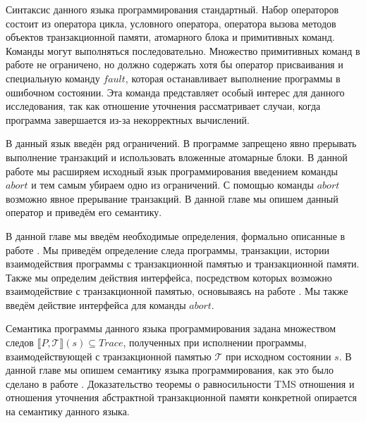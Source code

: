 Синтаксис данного языка программирования стандартный. Набор операторов состоит из оператора цикла, условного оператора, оператора вызова методов объектов транзакционной памяти, атомарного блока и примитивных команд. Команды могут выполняться последовательно. Множество примитивных команд в работе \cite{tms_article} не ограничено, но должно содержать хотя бы оператор присваивания и специальную команду $fault$, которая останавливает выполнение программы в ошибочном состоянии. Эта команда представляет особый интерес для данного исследования, так как отношение уточнения рассматривает случаи, когда программа завершается из-за некорректных вычислений.

В данный язык \cite{tms_article} введён ряд ограничений. В программе запрещено явно прерывать выполнение транзакций и использовать вложенные атомарные блоки. В данной работе мы расширяем исходный язык программирования введением команды $abort$ и тем самым убираем одно из ограничений. С помощью команды $abort$ возможно явное прерывание транзакций. В данной главе мы опишем данный оператор и приведём его семантику.

В данной главе мы введём необходимые определения, формально описанные в работе \cite{tms_article}. Мы приведём определение следа программы, транзакции, истории взаимодействия программы с транзакционной памятью и транзакционной памяти. Также мы определим действия интерфейса, посредством которых возможно взаимодействие с транзакционной памятью, основываясь на работе \cite{tms_article}. Мы также введём действие интерфейса для команды $abort$.

Семантика программы данного языка программирования задана множеством следов $\llbracket P, \mathcal{T} \rrbracket (s) \subseteq Trace$, полученных при исполнении программы, взаимодействующей с транзакционной памятью $\mathcal{T}$ при исходном состоянии $s$. В данной главе мы опишем семантику языка программирования, как это было сделано в работе \cite{tms_article}. Доказательство теоремы о равносильности TMS отношения и отношения уточнения абстрактной транзакционной памяти конкретной опирается на семантику данного языка. 

